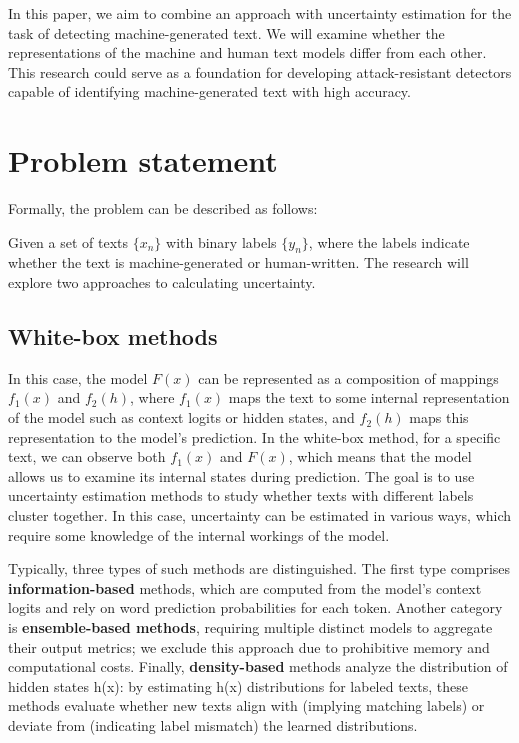 \documentclass[a4paper, 12pt]{article}
\begin{document}
In this paper, we aim to combine an approach with uncertainty estimation for the task of detecting machine-generated text. We will examine whether the representations of the machine and human text models differ from each other. This research could serve as a foundation for developing attack-resistant detectors capable of identifying machine-generated text with high accuracy.

\section{Problem statement}

Formally, the problem can be described as follows:  

Given a set of texts \(\{x_n\}\) with binary labels \(\{y_n\}\), where the labels indicate whether the text is machine-generated or human-written. The research will explore two approaches to calculating uncertainty.

\subsection {White-box methods}  
In this case, the model \(F(x)\) can be represented as a composition of mappings \(f_1(x)\) and \(f_2(h)\), where \(f_1(x)\) maps the text to some internal representation of the model such as context logits or hidden states, and \(f_2(h)\) maps this representation to the model's prediction. In the white-box method, for a specific text, we can observe both \(f_1(x)\) and \(F(x)\), which means that the model allows us to examine its internal states during prediction. The goal is to use uncertainty estimation methods to study whether texts with different labels cluster together. In this case, uncertainty can be estimated in various ways\citep{Polygraph}, which require some knowledge of the internal workings of the model. 

Typically, three types of such methods are distinguished. The first type comprises \textbf{information-based} methods, which are computed from the model's context logits and rely on word prediction probabilities for each token. Another category is \textbf{ensemble-based methods}, requiring multiple distinct models to aggregate their output metrics; we exclude this approach due to prohibitive memory and computational costs. Finally, \textbf{density-based} methods analyze the distribution of hidden states h(x): by estimating h(x) distributions for labeled texts, these methods evaluate whether new texts align with (implying matching labels) or deviate from (indicating label mismatch) the learned distributions.
\end{document}

